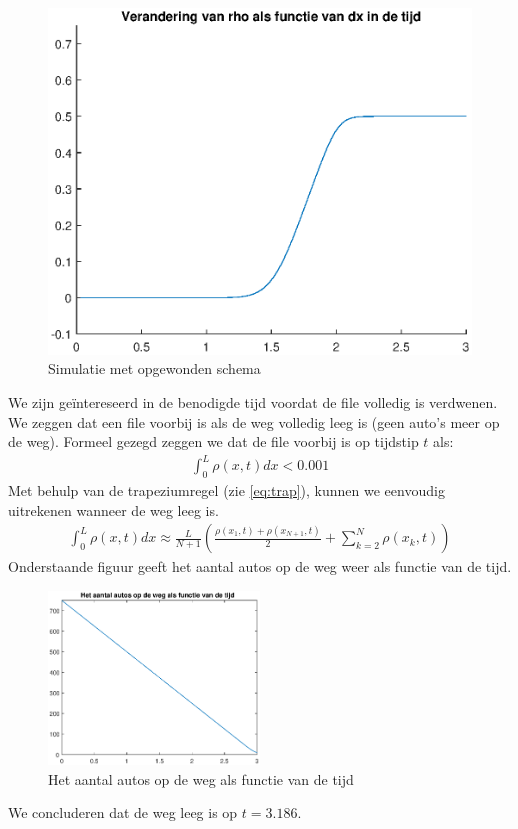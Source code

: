 \documentclass{article}
\begin{document}
\begin{figure}[H]
\centering
\includegraphics[scale=0.8]{6goed.eps}
\caption{Simulatie met opgewonden schema}
\end{figure}
We zijn ge\"intereseerd in de benodigde tijd voordat de file volledig is verdwenen.
We zeggen dat een file voorbij is als de weg volledig leeg is (geen auto's meer op de weg). 
Formeel gezegd zeggen we dat de file voorbij is op tijdstip \(t\) als:
\begin{align*}
	\int_{0}^L\rho(x,t)dx<0.001
\end{align*}
Met behulp van de trapeziumregel (zie \ref{eq:trap}), kunnen we eenvoudig uitrekenen wanneer de weg leeg is.
\begin{align}
	\int_{0}^L\rho(x,t)dx\approx\frac{L}{N+1}\left(\frac{\rho(x_1,t)+\rho(x_{N+1},t)}{2}+\sum_{k=2}^N\rho(x_k,t)\right)\label{eq:trap}
\end{align}
Onderstaande figuur geeft het aantal autos op de weg weer als functie van de tijd.  
\begin{figure}[H]
  \centering
  \includegraphics[width=0.5\textwidth]{autos.eps}
  \caption{Het aantal autos op de weg als functie van de tijd}
  \label{fig:autos}
\end{figure}
We concluderen dat de weg leeg is op \(t=3.186\).
\end{document}
